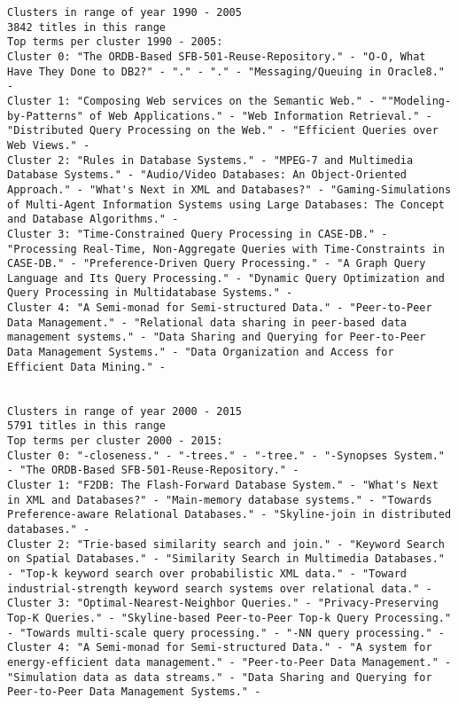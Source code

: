 \documentclass[11pt]{article}
\begin{document}
\begin{verbatim}
Clusters in range of year 1990 - 2005
3842 titles in this range
Top terms per cluster 1990 - 2005:
Cluster 0: "The ORDB-Based SFB-501-Reuse-Repository." - "O-O, What Have They Done to DB2?" - "." - "." - "Messaging/Queuing in Oracle8." - 
Cluster 1: "Composing Web services on the Semantic Web." - ""Modeling-by-Patterns" of Web Applications." - "Web Information Retrieval." - "Distributed Query Processing on the Web." - "Efficient Queries over Web Views." - 
Cluster 2: "Rules in Database Systems." - "MPEG-7 and Multimedia Database Systems." - "Audio/Video Databases: An Object-Oriented Approach." - "What's Next in XML and Databases?" - "Gaming-Simulations of Multi-Agent Information Systems using Large Databases: The Concept and Database Algorithms." - 
Cluster 3: "Time-Constrained Query Processing in CASE-DB." - "Processing Real-Time, Non-Aggregate Queries with Time-Constraints in CASE-DB." - "Preference-Driven Query Processing." - "A Graph Query Language and Its Query Processing." - "Dynamic Query Optimization and Query Processing in Multidatabase Systems." - 
Cluster 4: "A Semi-monad for Semi-structured Data." - "Peer-to-Peer Data Management." - "Relational data sharing in peer-based data management systems." - "Data Sharing and Querying for Peer-to-Peer Data Management Systems." - "Data Organization and Access for Efficient Data Mining." - 


Clusters in range of year 2000 - 2015
5791 titles in this range
Top terms per cluster 2000 - 2015:
Cluster 0: "-closeness." - "-trees." - "-tree." - "-Synopses System." - "The ORDB-Based SFB-501-Reuse-Repository." - 
Cluster 1: "F2DB: The Flash-Forward Database System." - "What's Next in XML and Databases?" - "Main-memory database systems." - "Towards Preference-aware Relational Databases." - "Skyline-join in distributed databases." - 
Cluster 2: "Trie-based similarity search and join." - "Keyword Search on Spatial Databases." - "Similarity Search in Multimedia Databases." - "Top-k keyword search over probabilistic XML data." - "Toward industrial-strength keyword search systems over relational data." - 
Cluster 3: "Optimal-Nearest-Neighbor Queries." - "Privacy-Preserving Top-K Queries." - "Skyline-based Peer-to-Peer Top-k Query Processing." - "Towards multi-scale query processing." - "-NN query processing." - 
Cluster 4: "A Semi-monad for Semi-structured Data." - "A system for energy-efficient data management." - "Peer-to-Peer Data Management." - "Simulation data as data streams." - "Data Sharing and Querying for Peer-to-Peer Data Management Systems." - 



\end{verbatim}
\end{document}
